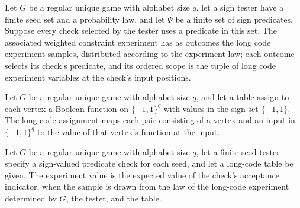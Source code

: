 \begin{definition}
\label{FABL.RegularUniqueGame.longCodeAllowedWeightedExperiment}
\leanok
{}
Let $G$ be a regular unique game with alphabet size $q$, let a sign tester have a finite
seed set and a probability law, and let $\Psi$ be a finite set of sign predicates.
Suppose every check selected by the tester uses a predicate in this set. The associated
weighted constraint experiment has as outcomes the long code experiment samples,
distributed according to the experiment law; each outcome selects its check's predicate,
and its ordered scope is the tuple of long code experiment variables at the check's
input positions.
\end{definition}

\begin{definition}
\label{FABL.RegularUniqueGame.longCodeAssignment}
\leanok
{}
Let $G$ be a regular unique game with alphabet size $q$, and let a table assign to each
vertex a Boolean function on $\{ -1,1 \}^q$ with values in the sign set $\{ -1,1
\}$. The long-code assignment maps each pair consisting of a vertex and an input in
$\{ -1,1 \}^q$ to the value of that vertex's function at the input.
\end{definition}

\begin{definition}
\label{FABL.RegularUniqueGame.longCodeExperimentValue}
\leanok
{}
Let $G$ be a regular unique game with alphabet size $q$, let a finite-seed tester
specify a sign-valued predicate check for each seed, and let a long-code table be given.
The experiment value is the expected value of the check's acceptance indicator, when the
sample is drawn from the law of the long-code experiment determined by $G$, the tester,
and the table.
\end{definition}


